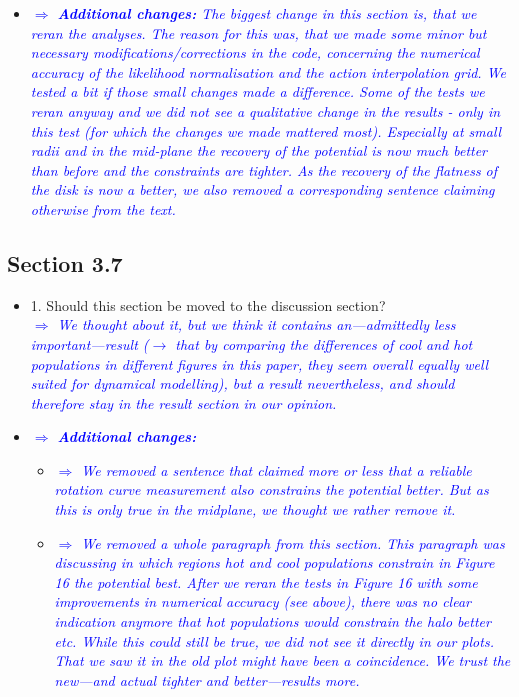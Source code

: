 \documentclass[10pt,a4paper]{article}
\newcommand{\Comment}[1]{\textsl{\textcolor{Blue}{$\Longrightarrow$ {#1}}}}
\begin{document}
\begin{itemize}
\item \Comment{\textbf{Additional changes:} The biggest change in this section is, that we reran the analyses. The reason for this was, that we made some minor but necessary modifications/corrections in the code, concerning the numerical accuracy of the likelihood normalisation and the action interpolation grid. We tested a bit if those small changes made a difference. Some of the tests we reran anyway and we did not see a qualitative change in the results - only in this test (for which the changes we made mattered most). Especially at small radii and in the mid-plane the recovery of the potential is now much better than before and the constraints are tighter. As the recovery of the flatness of the disk is now a better, we also removed a corresponding sentence claiming otherwise from the text.}
\end{itemize}

\subsection{Section 3.7}
\begin{itemize}
\item 1. Should this section be moved to the discussion section?
\\\Comment{We thought about it, but we think it contains an---admittedly less important---result ($\longrightarrow$ that by comparing the differences of cool and hot populations in different figures in this paper, they seem overall equally well suited for dynamical modelling), but a result nevertheless, and should therefore stay in the result section in our opinion.}
\item \Comment{\textbf{Additional changes:}} 
\begin{itemize}
\item \Comment{We removed a sentence that claimed more or less that a reliable rotation curve measurement also constrains the potential better. But as this is only true in the midplane, we thought we rather remove it.}
\item \Comment{We removed a whole paragraph from this section. This paragraph was discussing in which regions hot and cool populations constrain in Figure 16 the potential best. After we reran the tests in Figure 16 with some improvements in numerical accuracy (see above), there was no clear indication anymore that hot populations would constrain the halo better etc. While this could still be true, we did not see it directly in our plots. That we saw it in the old plot might have been a coincidence. We trust the new---and actual tighter and better---results more.}
\end{itemize}
\end{itemize}
\end{document}
